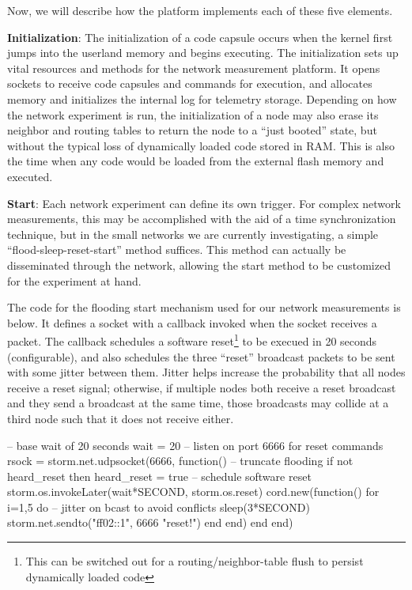 Now, we will describe how the platform implements each of these five elements.

\textbf{Initialization}: The initialization of a code capsule occurs when the kernel first jumps into the userland memory and begins executing.
The initialization sets up vital resources and methods for the network measurement platform.
It opens sockets to receive code capsules and commands for execution, and allocates memory and initializes the internal log for telemetry storage.
Depending on how the network experiment is run, the initialization of a node may also erase its neighbor and routing tables to return the node to a ``just booted'' state, but without the typical loss of dynamically loaded code stored in RAM.
This is also the time when any code would be loaded from the external flash memory and executed.

\textbf{Start}: Each network experiment can define its own trigger.
For complex network measurements, this may be accomplished with the aid of a time synchronization technique, but in the small networks we are currently investigating, a simple ``flood-sleep-reset-start'' method suffices.
This method can actually be disseminated through the network, allowing the start method to be customized for the experiment at hand.

The code for the flooding start mechanism used for our network measurements is below.
It defines a socket with a callback invoked when the socket receives a packet.
The callback schedules a software reset\footnote{This can be switched out for a routing/neighbor-table flush to persist dynamically loaded code} to be execued in 20 seconds (configurable), and also schedules the three ``reset'' broadcast packets to be sent with some jitter between them.
Jitter helps increase the probability that all nodes receive a reset signal; otherwise, if multiple nodes both receive a reset broadcast and they send a broadcast at the same time, those broadcasts may collide at a third node such that it does not receive either.

\begin{luacode}
-- base wait of 20 seconds
wait = 20
-- listen on port 6666 for reset commands
rsock = storm.net.udpsocket(6666, function()
 -- truncate flooding
 if not heard_reset then
  heard_reset = true
  -- schedule software reset
  storm.os.invokeLater(wait*SECOND, storm.os.reset)
  cord.new(function()
   for i=1,5 do
    -- jitter on bcast to avoid conflicts
    sleep(3*SECOND)
    storm.net.sendto("ff02::1", 6666 "reset!")
   end
  end)
 end
end)
\end{luacode}

